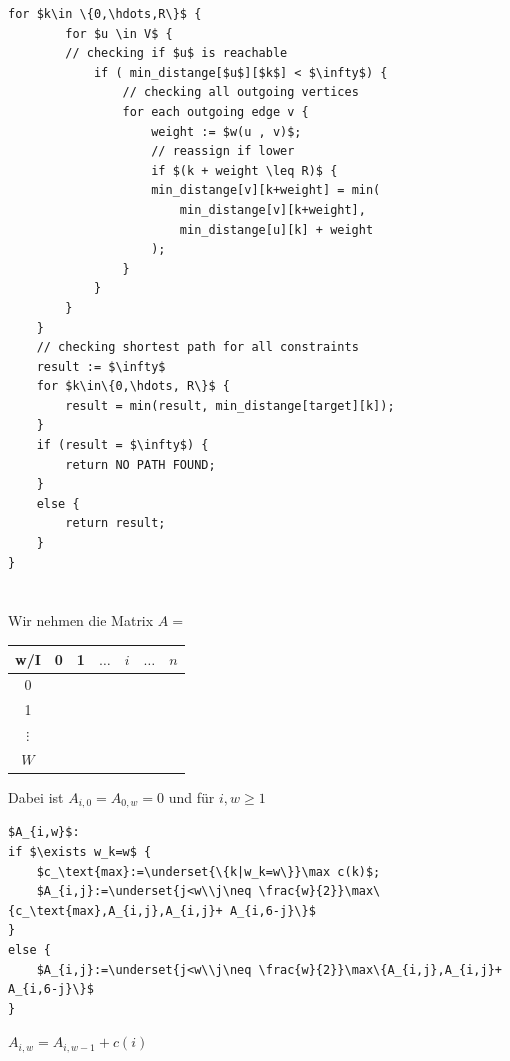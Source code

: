 \documentclass{article}
\begin{document}
\begin{enumerate}[a)]
\begin{lstlisting}[mathescape=true]
    for $k\in \{0,\hdots,R\}$ {
        for $u \in V$ {
        // checking if $u$ is reachable
            if ( min_distange[$u$][$k$] < $\infty$) {
                // checking all outgoing vertices
                for each outgoing edge v {
                    weight := $w(u , v)$;
                    // reassign if lower
                    if $(k + weight \leq R)$ {
                    min_distange[v][k+weight] = min(
                        min_distange[v][k+weight],
                        min_distange[u][k] + weight
                    );
                }
            }
        }
    }
    // checking shortest path for all constraints
    result := $\infty$
    for $k\in\{0,\hdots, R\}$ {
        result = min(result, min_distange[target][k]);
    }
    if (result = $\infty$) {
        return NO PATH FOUND;
    }
    else {
        return result;
    }
}
        \end{lstlisting}
\section{}
\section{}
Wir nehmen die Matrix $A=$
\begin{tabular}{c|cccccc}
	w/I&0&1&$\hdots$&$i$&$\hdots$&$n$\\
	\hline
	0\\
	1\\
	$\vdots$\\
	$W$\\
\end{tabular}

Dabei ist $A_{i,0}=A_{0,w}=0$ und für $i,w\geq 1$
\begin{lstlisting}[mathescape=true]
$A_{i,w}$:
if $\exists w_k=w$ {
    $c_\text{max}:=\underset{\{k|w_k=w\}}\max c(k)$;
    $A_{i,j}:=\underset{j<w\\j\neq \frac{w}{2}}\max\{c_\text{max},A_{i,j},A_{i,j}+ A_{i,6-j}\}$
}
else {
    $A_{i,j}:=\underset{j<w\\j\neq \frac{w}{2}}\max\{A_{i,j},A_{i,j}+ A_{i,6-j}\}$
}
\end{lstlisting}
$A_{i,w}=A_{i,w-1}+c(i)$
    \end{enumerate}
\end{document}
